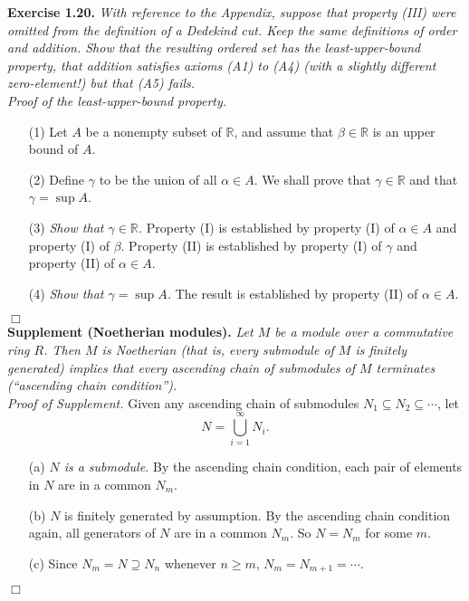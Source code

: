 \documentclass{article}
\begin{document}



\textbf{Exercise 1.20.}
\emph{With reference to the Appendix,
suppose that property (III) were omitted from the definition of a Dedekind cut.
Keep the same definitions of order and addition.
Show that the resulting ordered set has the least-upper-bound property,
that addition satisfies axioms (A1) to (A4) (with a slightly different zero-element!)
but that (A5) fails. } \\

\emph{Proof of the least-upper-bound property.}
\begin{enumerate}
\item[(1)]
Let $A$ be a nonempty subset of $\mathbb{R}$,
and assume that $\beta \in \mathbb{R}$ is an upper bound of $A$.
\item[(2)]
Define $\gamma$ to be the union of all $\alpha \in A$.
We shall prove that $\gamma \in \mathbb{R}$ and that $\gamma = \sup A$.
\item[(3)]
\emph{Show that $\gamma \in \mathbb{R}$.}
Property (I) is established by property (I) of $\alpha \in A$ and property (I) of $\beta$.
Property (II) is established by property (I) of $\gamma$ and property (II) of $\alpha \in A$.
\item[(4)]
\emph{Show that $\gamma = \sup A$.}
The result is established by property (II) of $\alpha \in A$.
\end{enumerate}
$\Box$ \\

\textbf{Supplement (Noetherian modules).}
\emph{Let $M$ be a module over a commutative ring $R$.
Then $M$ is Noetherian (that is, every submodule of $M$ is finitely generated)
implies that
every ascending chain of submodules of $M$ terminates
(``ascending chain condition'').} \\

\emph{Proof of Supplement.}
Given any ascending chain of submodules $N_1 \subseteq N_2 \subseteq \cdots$,
let $$N = \bigcup_{i=1}^{\infty} N_i.$$
\begin{enumerate}
\item[(a)]
\emph{$N$ is a submodule.}
By the ascending chain condition, each pair of elements in $N$ are in a common $N_m$.
\item[(b)]
$N$ is finitely generated by assumption.
By the ascending chain condition again, all generators of $N$ are in a common $N_m$.
So $N = N_m$ for some $m$.
\item[(c)]
Since $N_m = N \supseteq N_n$ whenever $n \geq m$,
$N_m = N_{m+1} = \cdots$.
\end{enumerate}
$\Box$ \\
\end{document}
